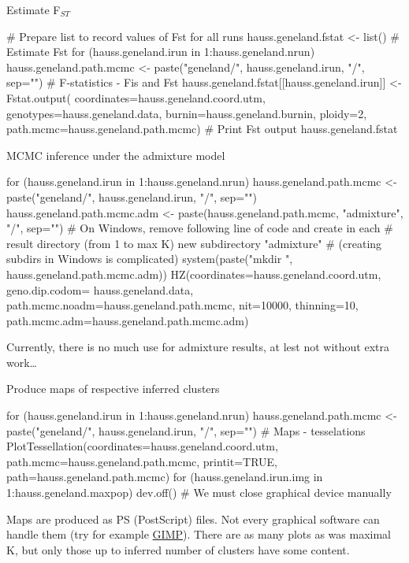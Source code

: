 \documentclass[compress, ucs, xelatex, 11pt, xcolor=svgnames,
  hyperref={
    bookmarks=true,
    unicode=true,
    colorlinks=true,
    pdftitle={Molecular data in R},
    plainpages=false,
    pdfauthor={Vojtech Zeisek},
    pdfsubject={Course about phylogeny and evolution in R},
    pdfcreator={XeLaTeX},
    pdfkeywords={R, evolution, phylogeny, molecular data},
    linkcolor=Tomato,
    anchorcolor=SaddleBrown,
    citecolor=Goldenrod,
    filecolor=DarkMagenta,
    menucolor=Sienna,
    urlcolor=DarkTurquoise,
    pdftex},
  url={hyphens, lowtilde} %
  ]{beamer}
\begin{document}
\begin{frame}[fragile]{Estimate F$_{ST}$}
  \begin{spluscode}
    # Prepare list to record values of Fst for all runs
    hauss.geneland.fstat <- list()
    # Estimate Fst
    for (hauss.geneland.irun in 1:hauss.geneland.nrun) {
      hauss.geneland.path.mcmc <- paste("geneland/", hauss.geneland.irun,
        "/", sep="")
      # F-statistics - Fis and Fst
      hauss.geneland.fstat[[hauss.geneland.irun]] <- Fstat.output(
        coordinates=hauss.geneland.coord.utm, genotypes=hauss.geneland.data,
        burnin=hauss.geneland.burnin, ploidy=2,
        path.mcmc=hauss.geneland.path.mcmc)
      }
      # Print Fst output
      hauss.geneland.fstat
  \end{spluscode}
\end{frame}

\begin{frame}[fragile]{MCMC inference under the admixture model}
  \begin{spluscode}
    for (hauss.geneland.irun in 1:hauss.geneland.nrun) {
      hauss.geneland.path.mcmc <- paste("geneland/",
        hauss.geneland.irun, "/", sep="")
      hauss.geneland.path.mcmc.adm <- paste(hauss.geneland.path.mcmc,
        "admixture", "/", sep="")
      # On Windows, remove following line of code and create in each
      # result directory (from 1 to max K) new subdirectory "admixture"
      # (creating subdirs in Windows is complicated)
      system(paste("mkdir ", hauss.geneland.path.mcmc.adm))
      HZ(coordinates=hauss.geneland.coord.utm, geno.dip.codom=
        hauss.geneland.data, path.mcmc.noadm=hauss.geneland.path.mcmc,
        nit=10000, thinning=10, path.mcmc.adm=hauss.geneland.path.mcmc.adm)
      }
  \end{spluscode}
\vfil
Currently, there is no much use for admixture results, at lest not without extra work\ldots
\end{frame}

\begin{frame}[fragile]{Produce maps of respective inferred clusters}
  \begin{spluscode}
    for (hauss.geneland.irun in 1:hauss.geneland.nrun) {
      hauss.geneland.path.mcmc <- paste("geneland/",
        hauss.geneland.irun, "/", sep="")
      # Maps - tesselations
      PlotTessellation(coordinates=hauss.geneland.coord.utm,
        path.mcmc=hauss.geneland.path.mcmc, printit=TRUE,
        path=hauss.geneland.path.mcmc)
      for (hauss.geneland.irun.img in 1:hauss.geneland.maxpop) {
        dev.off() } # We must close graphical device manually
      }
  \end{spluscode}
\vfil
Maps are produced as PS (PostScript) files. Not every graphical software can handle them (try for example \href{https://www.gimp.org/}{GIMP}). There are as many plots as was maximal K, but only those up to inferred number of clusters have some content.
\end{frame}
\end{document}
